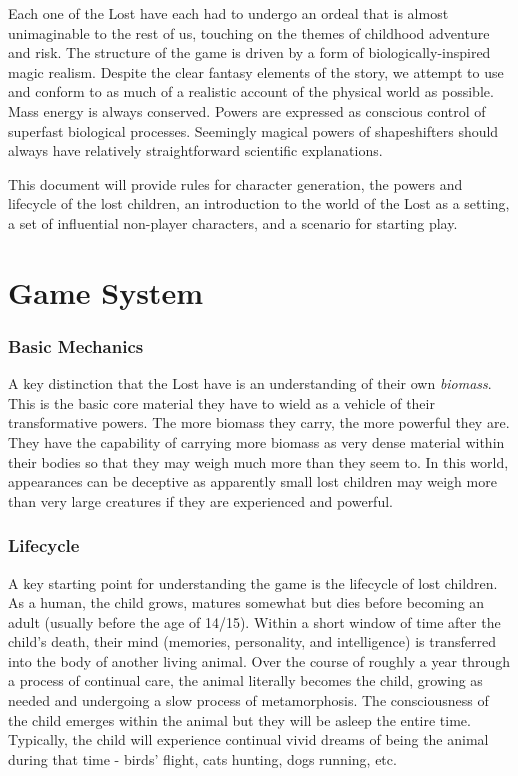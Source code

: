 \documentclass[letterpaper,serif]{rpg-module}
\begin{document}
Each one of the Lost have each had to undergo an ordeal that is almost unimaginable to the rest of us, touching on the themes of childhood adventure and risk. The structure of the game is driven by a form of biologically-inspired magic realism. Despite the clear fantasy elements of the story, we attempt to use and conform to as much of a realistic account of the physical world as possible. Mass energy is always conserved. Powers are expressed as conscious control of superfast biological processes. Seemingly magical powers of shapeshifters should always have relatively straightforward scientific explanations. 

This document will provide rules for character generation, the powers and lifecycle of the lost children, an introduction to the world of the Lost as a setting, a set of influential non-player characters, and a scenario for starting play. 

\part{Game System}
\label{system}

\section{Basic Mechanics}

A key distinction that the Lost have is an understanding of their own \emph{biomass}.	This is the basic core material they have to wield as a vehicle of their 
transformative powers. The more biomass they carry, the more powerful they are. 
They have the capability of carrying more biomass as very dense material within
their bodies so that they may weigh much more than they seem to. In this world, 
appearances can be deceptive as apparently small lost children may weigh more than very large creatures if they are experienced and powerful. 

\section{Lifecycle}

A key starting point for understanding the game is the lifecycle of lost children. As a human, the child grows, matures somewhat but dies before becoming an adult (usually before the age of 14/15). Within a short window of time after the child's death, their mind (memories, personality, and intelligence) is transferred into the body of another living animal. Over the course of roughly a year through a process of continual care, the animal literally becomes the child, growing as needed and undergoing a slow process of metamorphosis. The consciousness of the child emerges within the animal but they will be asleep the entire time. Typically, the child will experience continual vivid dreams of being the animal during that time - birds' flight, cats hunting, dogs running, etc. 
\end{document}
